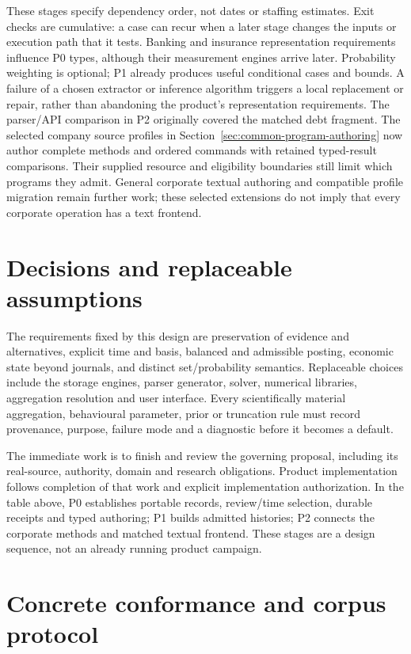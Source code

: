 These stages specify dependency order, not dates or staffing estimates.
Exit checks are cumulative: a case can recur when a later stage changes the
inputs or execution path that it tests.
Banking and insurance representation requirements influence P0 types, although
their measurement engines arrive later. Probability weighting is optional;
P1 already produces useful conditional cases and bounds. A failure of a chosen
extractor or inference algorithm triggers a local replacement or repair,
rather than abandoning the product's representation requirements.
The parser/API comparison in P2 originally covered the matched debt fragment.
The selected company source profiles in Section~\ref{sec:common-program-authoring}
now author complete methods and ordered commands with retained typed-result
comparisons. Their supplied resource and eligibility boundaries still limit
which programs they admit. General corporate textual authoring and compatible
profile migration remain further work; these selected extensions do not imply
that every corporate operation has a text frontend.

\section{Decisions and replaceable assumptions}

The requirements fixed by this design are preservation of evidence and
alternatives, explicit time and basis, balanced and admissible posting, economic
state beyond journals, and distinct set/probability semantics. Replaceable
choices include the storage engines, parser generator, solver, numerical
libraries, aggregation resolution and user interface. Every scientifically
material aggregation, behavioural parameter, prior or truncation rule must
record provenance, purpose, failure mode and a diagnostic before it becomes a
default.

The immediate work is to finish and review the governing proposal, including
its real-source, authority, domain and research obligations. Product
implementation follows completion of that work and explicit implementation
authorization. In the table above, P0 establishes portable records, review/time
selection, durable receipts and typed authoring; P1 builds admitted histories;
P2 connects the corporate methods and matched textual frontend. These stages
are a design sequence, not an already running product campaign.

\section{Concrete conformance and corpus protocol}

